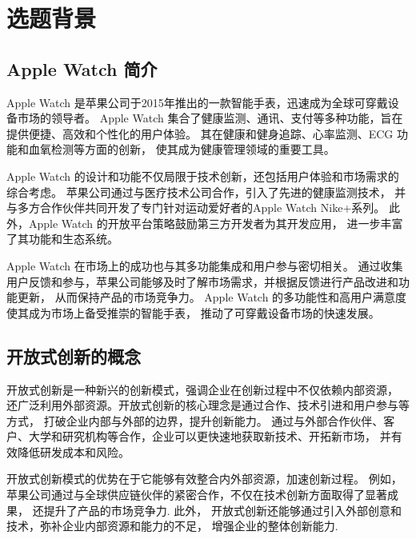 
\chapter{选题背景}

\section{Apple Watch 简介}

Apple Watch 是苹果公司于2015年推出的一款智能手表，迅速成为全球可穿戴设备市场的领导者。
Apple Watch 集合了健康监测、通讯、支付等多种功能，旨在提供便捷、高效和个性化的用户体验。
其在健康和健身追踪、心率监测、ECG 功能和血氧检测等方面的创新，
使其成为健康管理领域的重要工具\citep{apple2024, gehani2016corporate, davidson_assessing_2023}。

Apple Watch 的设计和功能不仅局限于技术创新，还包括用户体验和市场需求的综合考虑。
苹果公司通过与医疗技术公司合作，引入了先进的健康监测技术，
并与多方合作伙伴共同开发了专门针对运动爱好者的Apple Watch Nike+系列\citep{apple2024}。
此外，Apple Watch 的开放平台策略鼓励第三方开发者为其开发应用，
进一步丰富了其功能和生态系统\citep{dahlander_how_2010}。

Apple Watch 在市场上的成功也与其多功能集成和用户参与密切相关。
通过收集用户反馈和参与，苹果公司能够及时了解市场需求，并根据反馈进行产品改进和功能更新，
从而保持产品的市场竞争力\citep{chesbrough_beyond_2006, chesbrough2016}。
Apple Watch 的多功能性和高用户满意度使其成为市场上备受推崇的智能手表，
推动了可穿戴设备市场的快速发展\citep{gehani2016corporate, davidson_assessing_2023}。

\section{开放式创新的概念}

开放式创新是一种新兴的创新模式，强调企业在创新过程中不仅依赖内部资源，
还广泛利用外部资源。开放式创新的核心理念是通过合作、技术引进和用户参与等方式，
打破企业内部与外部的边界，提升创新能力\citep{chesbrough_beyond_2006}。
通过与外部合作伙伴、客户、大学和研究机构等合作，企业可以更快速地获取新技术、开拓新市场，
并有效降低研发成本和风险\citep{dahlander_how_2010}。

开放式创新模式的优势在于它能够有效整合内外部资源，加速创新过程。
例如，苹果公司通过与全球供应链伙伴的紧密合作，不仅在技术创新方面取得了显著成果，
还提升了产品的市场竞争力\citep{zhang_pingguo_2014}. 此外，
开放式创新还能够通过引入外部创意和技术，弥补企业内部资源和能力的不足，
增强企业的整体创新能力\citep{chen_ziyuan_2006}. 

